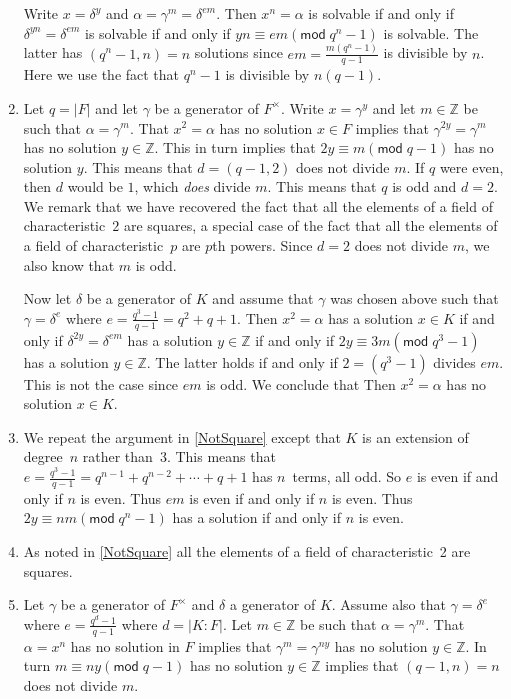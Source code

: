 \documentclass[12pt]{article}
\renewcommand{\pmod}[1]{\left(\mathsf{mod}\;#1\right)}
\begin{document}
\begin{enumerate}
Write $x=\delta^y$ and $\alpha=\gamma^m=\delta^{em}$.
Then $x^n=\alpha$ is solvable if and only if
$\delta^{yn}=\delta^{em}$ is solvable if and only if
$yn\equiv em\pmod{q^n-1}$ is solvable.
The latter has $\left(q^n-1,n\right)=n$ solutions since
$em=\frac{m\left(q^n-1\right)}{q-1}$
is divisible by $n$. Here we use the fact
that $q^n-1$ is divisible by $n\left(q-1\right)$.

\item\label{NotSquare} %
Let $q=\left|F\right|$ and let $\gamma$ be a generator
of $F^\times$.  Write $x=\gamma^y$ and let
$m\in\mathbb{Z}$ be such that $\alpha=\gamma^m$.
That $x^2=\alpha$ has no solution $x\in F$ implies that
$\gamma^{2y}=\gamma^{m}$ has no solution $y\in\mathbb{Z}$.
This in turn implies that $2y\equiv m\pmod{q-1}$ has no solution $y$.
This means that $d=\left(q-1,2\right)$ does not divide $m$.
If $q$ were even, then $d$ would be $1$, which {\em does} divide $m$.
This means that $q$ is odd and $d=2$.
We remark that we have recovered the fact that all the
elements of a field of characteristic~$2$ are squares,
a special case of the fact that all the elements
of a field of characteristic~$p$ are $p$th powers.
Since $d=2$ does not divide $m$, we also know that $m$ is odd.

Now let $\delta$ be a generator of $K$
and assume that $\gamma$ was chosen above such that $\gamma=\delta^e$
where $e=\frac{q^3-1}{q-1}=q^2+q+1$.
Then $x^2=\alpha$ has a solution $x\in K$
if and only if $\delta^{2y}=\delta^{em}$ has a solution $y\in\mathbb{Z}$
if and only if $2y\equiv 3m\pmod{q^3-1}$ has a solution $y\in\mathbb{Z}$.
The latter holds if and only if $2=\left(q^3-1\right)$ divides $em$.
This is not the case since $em$ is odd. We conclude that
Then $x^2=\alpha$ has no solution $x\in K$.

\item We repeat the argument in \autoref{NotSquare}
except that $K$ is an extension of degree~$n$ rather than~$3$.
This means that
$e=\frac{q^3-1}{q-1}=q^{n-1}+q^{n-2}+\cdots+q+1$ has
$n$~terms, all odd.
So $e$ is even if and only if $n$ is even.
Thus $em$ is even if and only
if $n$ is even. Thus $2y\equiv nm\pmod{q^n-1}$ has a solution
if and only if $n$ is even.

\item %
As noted in \autoref{NotSquare} all the elements of
a field of characteristic~2 are squares.

\item %
Let $\gamma$ be a generator of $F^\times$
and $\delta$ a generator of $K$.
Assume also that $\gamma=\delta^e$
where $e=\frac{q^d-1}{q-1}$ where $d=\left|K:F\right|$.
Let $m\in\mathbb{Z}$ be such that $\alpha=\gamma^m$.
That $\alpha=x^n$ has no solution in $F$ implies that
$\gamma^m=\gamma^{ny}$ has no solution $y\in\mathbb{Z}$.
In turn $m\equiv ny\pmod{q-1}$ has no solution $y\in\mathbb{Z}$
implies that $\left(q-1,n\right)=n$ does not divide $m$.


\end{enumerate}
\end{document}
